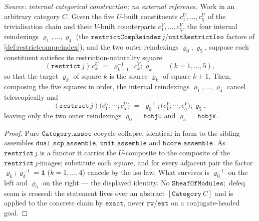 \begin{lemma}

  \label{lem:trivialisation_telescope_assemble}
  \textit{Source: internal categorical construction; no external reference.}
  Work in an arbitrary category \(C\). Given the five \(U\)-built constituents \(c^U_1, \dots, c^U_5\)
  of the trivialisation chain and their \(V\)-built counterparts \(c^V_1, \dots, c^V_5\), the four
  internal reindexings \(\varrho_1, \dots, \varrho_4\) (the
  \(\mathtt{restrictCompReindex}\,j\)/\(\mathtt{unitRestrictIso}\) factors of
  \cref{def:restrictcompreindex}), and the two outer reindexings \(\varrho_0, \varrho_5\), suppose each
  constituent satisfies its restriction-naturality square
  \[
    (\mathtt{restrict}\,j)\,c^U_k \;=\; \varrho_{k-1}^{-1} \mathbin{;} c^V_k \mathbin{;} \varrho_k
    \qquad (k = 1, \dots, 5),
  \]
  so that the target \(\varrho_k\) of square \(k\) is the source \(\varrho_k\) of square \(k+1\). Then,
  composing the five squares in order, the internal reindexings \(\varrho_1, \dots, \varrho_4\) cancel
  telescopically and
  \[
    (\mathtt{restrict}\,j)\bigl(c^U_1 \mathbin{;} \cdots \mathbin{;} c^U_5\bigr)
      \;=\; \varrho_0^{-1} \mathbin{;} \bigl(c^V_1 \mathbin{;} \cdots \mathbin{;} c^V_5\bigr) \mathbin{;} \varrho_5,
  \]
  leaving only the two outer reindexings \(\varrho_0 = \mathtt{hobjU}\) and \(\varrho_5 = \mathtt{hobjV}\).
\end{lemma}
\begin{proof}

\leanok
  Pure \(\mathtt{Category.assoc}\) cocycle collapse, identical in form to the sibling assembles
  \(\mathtt{dual\_scp\_assemble}\), \(\mathtt{unit\_assemble}\) and \(\mathtt{hcore\_assemble}\). As
  \(\mathtt{restrict}\,j\) is a functor it carries the \(U\)-composite to the composite of the
  \(\mathtt{restrict}\,j\)-images; substitute each square, and for every adjacent pair the factor
  \(\varrho_k \mathbin{;} \varrho_k^{-1} = \mathbf{1}\) (\(k = 1, \dots, 4\)) cancels by the iso law.
  What survives is \(\varrho_0^{-1}\) on the left and \(\varrho_5\) on the right --- the displayed
  identity. No \(\mathtt{SheafOfModules} \mathbin{;}\) defeq seam is crossed: the statement lives over an
  abstract \([\mathtt{Category}\ C]\) and is applied to the concrete chain by \(\mathtt{exact}\), never
  \(\mathtt{rw}\)/\(\mathtt{ext}\) on a conjugate-headed goal.
\end{proof}

